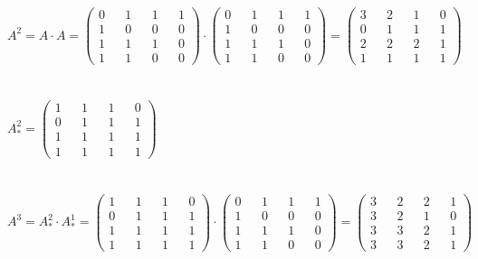 \documentclass{article}
\begin{document}
$
A^{2} = A \cdot A = 
\begin{pmatrix}
  0 && 1 && 1 && 1 \\
  1 && 0 && 0 && 0 \\
  1 && 1 && 1 && 0 \\
  1 && 1 && 0 && 0
\end{pmatrix}
\cdot
\begin{pmatrix}
  0 && 1 && 1 && 1 \\
  1 && 0 && 0 && 0 \\
  1 && 1 && 1 && 0 \\
  1 && 1 && 0 && 0
\end{pmatrix}
=
\begin{pmatrix}
  3 && 2 && 1 && 0 \\
  0 && 1 && 1 && 1 \\
  2 && 2 && 2 && 1 \\
  1 && 1 && 1 && 1
\end{pmatrix}
$
\\\\\\
$
A^{2}_{*} = 
\begin{pmatrix}
  1 && 1 && 1 && 0 \\
  0 && 1 && 1 && 1 \\
  1 && 1 && 1 && 1 \\
  1 && 1 && 1 && 1
\end{pmatrix}
$
\\\\\\
$
A^{3} = A^{2}_{*} \cdot A^{1}_{*} = 
\begin{pmatrix}
  1 && 1 && 1 && 0 \\
  0 && 1 && 1 && 1 \\
  1 && 1 && 1 && 1 \\
  1 && 1 && 1 && 1
\end{pmatrix}
\cdot
\begin{pmatrix}
  0 && 1 && 1 && 1 \\
  1 && 0 && 0 && 0 \\
  1 && 1 && 1 && 0 \\
  1 && 1 && 0 && 0
\end{pmatrix}
=
\begin{pmatrix}
  3 && 2 && 2 && 1 \\
  3 && 2 && 1 && 0 \\
  3 && 3 && 2 && 1 \\
  3 && 3 && 2 && 1
\end{pmatrix}
$
\\\\\\
\end{document}

